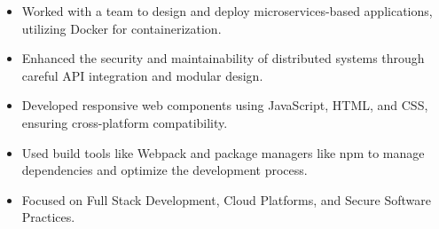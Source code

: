 \par\smallskip
\noindent
\begin{minipage}{20cm}
  \begin{minipage}{9.75cm}
    \begin{itemize}
      \item Worked with a team to design and deploy microservices-based applications, utilizing Docker for containerization.
      \item Enhanced the security and maintainability of distributed systems through careful API integration and modular design.
    \end{itemize}
  \end{minipage}
  \hfill
  \begin{minipage}{9.75cm}
    \begin{itemize}
      \item Developed responsive web components using JavaScript, HTML, and CSS, ensuring cross-platform compatibility.
      \item Used build tools like Webpack and package managers like npm to manage dependencies and optimize the development process.
    \end{itemize}
  \end{minipage}
\end{minipage}

\begin{itemize}
  \item Focused on Full Stack Development, Cloud Platforms, and Secure Software Practices.
\end{itemize}

\noindent
\begin{minipage}{20cm}
\end{minipage}


